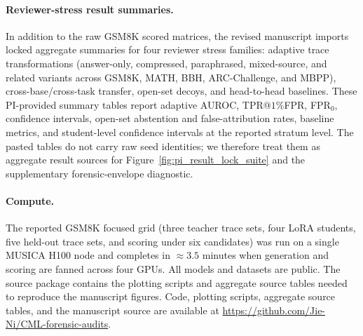 \paragraph{Reviewer-stress result summaries.}
In addition to the raw GSM8K scored matrices, the revised manuscript imports locked
aggregate summaries for four reviewer stress families: adaptive trace transformations
(answer-only, compressed, paraphrased, mixed-source, and related variants across
GSM8K, MATH, BBH, ARC-Challenge, and MBPP), cross-base/cross-task transfer,
open-set decoys, and head-to-head baselines. These PI-provided summary tables
report adaptive AUROC, TPR@$1\%$FPR, FPR$_0$, confidence intervals, open-set
abstention and false-attribution rates, baseline metrics, and student-level
confidence intervals at the reported stratum level. The pasted tables do not carry
raw seed identities; we therefore treat them as aggregate result sources for
Figure~\ref{fig:pi_result_lock_suite} and the supplementary forensic-envelope
diagnostic.

\paragraph{Compute.}
The reported GSM8K focused grid (three teacher trace sets, four LoRA students, five
held-out trace sets, and scoring under six candidates) was run on a single MUSICA
H100 node and completes in
$\approx\!3.5$ minutes when generation and scoring are fanned across four GPUs. All models and
datasets are public. The source package contains the plotting scripts and aggregate
source tables needed to reproduce the manuscript figures. Code, plotting scripts,
aggregate source tables, and the manuscript source are available at
\url{https://github.com/Jie-Ni/CML-forensic-audits}.
